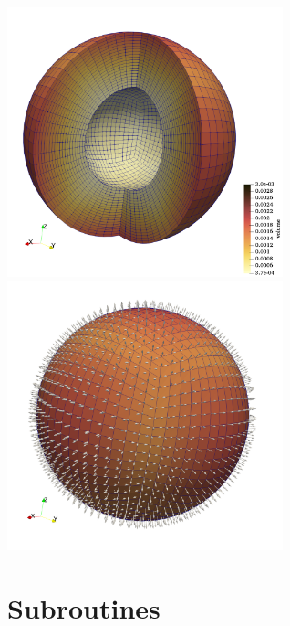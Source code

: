 \documentclass[a4paper]{article}
\begin{document}
\includegraphics[width=8cm]{images/tas/volume}
\includegraphics[width=8cm]{images/tas/normals}

\newpage


\section{Subroutines}




\end{document}
